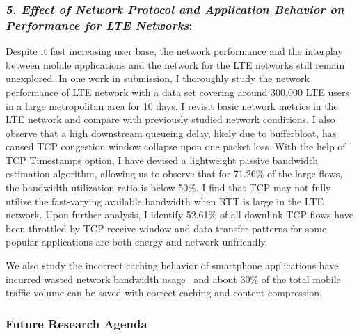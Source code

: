 \documentclass[10pt]{article}
\begin{document}
\begin{small}
\subsubsection*{\emph{5. Effect of Network Protocol and Application Behavior on Performance for LTE Networks}:}

Despite it fast increasing user base, the network performance and the interplay between mobile applications and the network for the LTE networks still remain unexplored. In one work in submission, I thoroughly study the network performance of LTE network with a data set covering around 300,000 LTE users in a large metropolitan area for 10 days. I revisit basic network metrics in the LTE network and compare with previously studied network conditions. I also observe that a high downstream queueing delay, likely due to bufferbloat,  has caused TCP congestion window collapse upon one packet loss. With the help of TCP Timestamps option, I have devised a lightweight passive bandwidth estimation algorithm, allowing us to observe that for 71.26\% of the large flows, the bandwidth utilization ratio is below 50\%. I find that TCP may not fully utilize the fast-varying available bandwidth when RTT is large in the LTE network. Upon further analysis, I identify 52.61\% of all downlink TCP flows have been throttled by TCP receive window and data transfer patterns for some popular applications are both energy and network unfriendly.

We also study the incorrect caching behavior of smartphone applications have incurred wasted network bandwidth usage~\cite{qian12_mobisys} and about 30\% of the total mobile traffic volume can be saved with correct caching and content compression.

\subsubsection*{Future Research Agenda}


\end{small}
\end{document}
